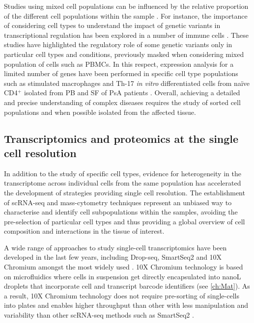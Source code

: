 Studies using mixed cell populations can be influenced by the relative proportion of the different cell populations within the sample \parencite{Whitney2003}. For instance, the importance of considering cell types to understand the impact of genetic variants in transcriptional regulation has been explored in a number of immune cells \parencite{Fairfax2012, Fairfax2014, Raj2014, Peters2016, Kasela2017}. These studies have highlighted the regulatory role of some genetic variants only in particular cell types and conditions, previously masked when considering mixed population of cells such as PBMCs. In this respect, expression analysis for a limited number of genes have been performed in specific cell type populations such as stimulated macrophages and Th-17 \textit{in vitro} differentiated cells from na\"{i}ve CD4$^+$ isolated from PB and SF of PsA patients \parencite{Antoniv2006, Leipe2010}. Overall, achieving a detailed and precise understanding of complex diseases requires the study of sorted cell populations and when possible isolated from the affected tissue.  


\subsection{Transcriptomics and proteomics at the single cell resolution}

In addition to the study of specific cell types, evidence for heterogeneity in the transcriptome across individual cells from the same population has accelerated the development of strategies providing single cell resolution. The establishment of scRNA-seq and mass-cytometry techniques represent an unbiased way to characterise and identify cell subpopulations within the samples, avoiding the pre-selection of particular cell types and thus providing a global overview of cell composition and interactions in the tissue of interest. 

A wide range of approaches to study single-cell transcriptomics have been developed in the last few years, including Drop-seq, SmartSeq2 and 10X Chromium amongst the most widely used \parencite{Picelli2014,Ziegenhain2017}. 10X Chromium technology is based on microfluidics where cells in suspension get directly encapsulated into nanoL droplets that incorporate cell and transcript barcode identifiers (see \ref{ch:Mat}). As a result, 10X Chromium technology does not require pre-sorting of single-cells into plates and enables higher throughput than other with less manipulation and variability than other scRNA-seq methods such as SmartSeq2 \parencite{Baran-Gale2017}.
 
